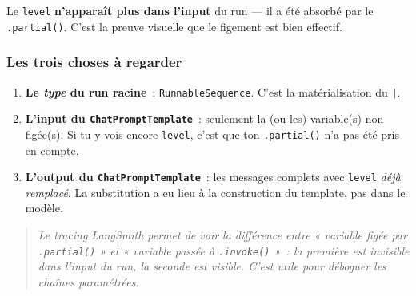 \documentclass[11pt,a4paper]{article}
\begin{document}
Le \texttt{level} \textbf{n'apparaît plus dans l'input} du run — il a été
absorbé par le \texttt{.partial()}. C'est la preuve visuelle que le
figement est bien effectif.

\subsubsection*{Les trois choses à regarder}

\begin{enumerate}[leftmargin=*]
  \item \textbf{Le \emph{type} du run racine}~: \texttt{RunnableSequence}.
        C'est la matérialisation du \texttt{|}.
  \item \textbf{L'input du \texttt{ChatPromptTemplate}}~: seulement la (ou
        les) variable(s) non figée(s). Si tu y vois encore \texttt{level},
        c'est que ton \texttt{.partial()} n'a pas été pris en compte.
  \item \textbf{L'output du \texttt{ChatPromptTemplate}}~: les messages
        complets avec \texttt{level} \emph{déjà remplacé}. La substitution
        a eu lieu à la construction du template, pas dans le modèle.
\end{enumerate}

\begin{quote}\itshape
Le tracing LangSmith permet de \emph{voir} la différence entre
« variable figée par \texttt{.partial()} » et « variable passée à
\texttt{.invoke()} »~: la première est invisible dans l'input du run, la
seconde est visible. C'est utile pour déboguer les chaînes paramétrées.
\end{quote}
\end{document}
